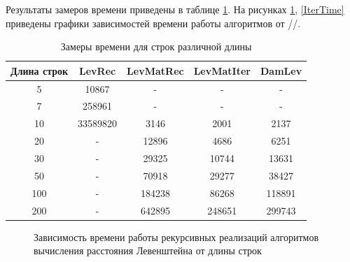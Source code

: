 \documentclass[12pt]{report}
\begin{document}
Результаты замеров времени приведены в таблице \ref{time}. На рисунках \ref{recTime}, \ref{IterTime} приведены графики зависимостей времени работы алгоритмов от //.

\newpage
\begin{table}[h]
	\begin{center}
		\caption{\label{time} Замеры времени для строк различной длины}
		\begin{tabular}{|c c c c c|} 
 			\hline
			Длина строк & LevRec & LevMatRec & LevMatIter & DamLev \\ [0.5ex] 
 			\hline\hline
 			5 & 10867 & - & - & -\\
 			\hline
 			7 & 258961 & - & - & -\\
 			\hline
			10 & 33589820 & 3146 & 2001 & 2137\\
			\hline
			20 & - & 12896 & 4686 & 6251\\
			\hline
			30 & - & 29325 & 10744 & 13631\\
			\hline
			50 & - & 70918 & 29277 & 38427\\
			\hline
			100 & - & 184238 & 86268 & 118891\\
			\hline
			200 & - & 642895 & 248651 & 299743\\
			\hline
			\end{tabular}
	\end{center}
\end{table}

\begin{figure}[h]
\begin{center}
	\captionsetup{justification=centering}
	\caption{Зависимость времени работы рекурсивных реализаций алгоритмов вычисления расстояния Левенштейна от длины строк}
	\label{recTime}
	\end{center}
\end{figure}
\end{document}
